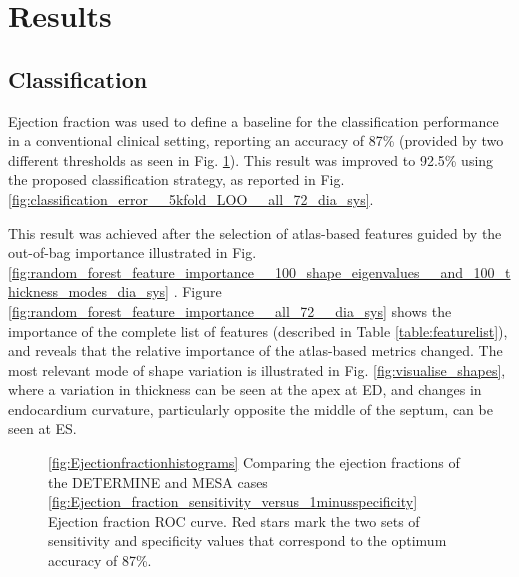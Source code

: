 \documentclass[journal]{IEEEtran}
\begin{document}
\section{Results}
	\subsection{Classification}
Ejection fraction was used to define a baseline for the classification performance in a conventional clinical setting, reporting an accuracy of 87\% (provided by two different thresholds as seen in Fig. \ref{fig:EFs}). This result was improved to 92.5\% using the proposed classification strategy, as reported in Fig.    \ref{fig:classification_error__5kfold_LOO__all_72_dia_sys}. 

This result was achieved after the selection of atlas-based features guided by the out-of-bag importance illustrated in Fig. \ref{fig:random_forest_feature_importance__100_shape_eigenvalues__and_100_thickness_modes_dia_sys} . Figure \ref{fig:random_forest_feature_importance__all_72__dia_sys} shows the importance of the complete list of features (described in Table \ref{table:featurelist}), and reveals that the relative importance of the atlas-based metrics changed. The most relevant mode of shape variation is illustrated in Fig. \ref{fig:visualise_shapes}, where a variation in thickness can be seen at the apex at ED, and changes in endocardium curvature, particularly opposite the middle of the septum, can be seen at ES. 

		
		\begin{figure}[]
		\begin{center}
		
		

\caption{ \ref{fig:Ejectionfractionhistograms} Comparing the ejection fractions of the DETERMINE and MESA cases \ref{fig:Ejection_fraction_sensitivity_versus_1minusspecificity} Ejection fraction ROC curve. Red stars mark the two sets of sensitivity and specificity values that correspond to the optimum accuracy of 87\%.}
\label{fig:EFs}
  
\end{center}

		\end{figure}
\end{document}
